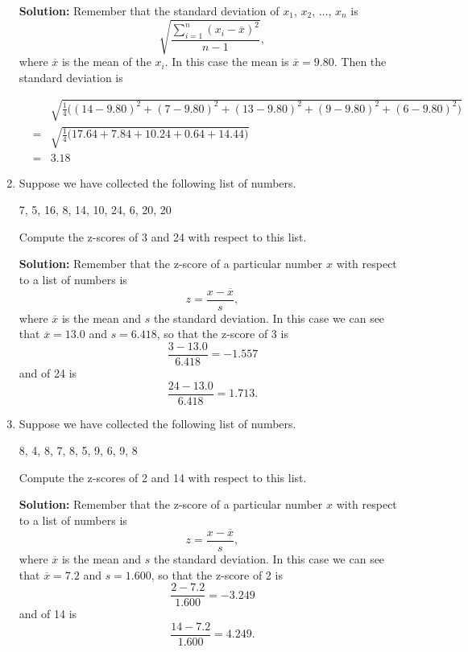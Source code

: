 \documentclass{article}
\begin{document}
\begin{enumerate}
\textbf{Solution:} Remember that the standard deviation of $x_1$, $x_2$, $\ldots$, $x_n$ is \[ \sqrt{\frac{\sum_{i=1}^n (x_i - \overline{x})^2}{n-1}}, \] where $\overline{x}$ is the mean of the $x_i$. In this case the mean is $\overline{x} = 9.80$. Then the standard deviation is

\begin{eqnarray*}
 & & \sqrt{\frac{1}{4}\big( (14 - 9.80)^2 + (7 - 9.80)^2 + (13 - 9.80)^2 + (9 - 9.80)^2 + (6 - 9.80)^2 \big)} \\
 & = & \sqrt{\frac{1}{4}\big( 17.64 + 7.84 + 10.24 + 0.64 + 14.44 \big)} \\
 & = & 3.18
\end{eqnarray*}


  
\vspace{1cm}

\item Suppose we have collected the following list of numbers.

\begin{center}
7, 5, 16, 8, 14, 10, 24, 6, 20, 20
\end{center}

Compute the z-scores of 3 and 24 with respect to this list.

\textbf{Solution:} Remember that the z-score of a particular number $x$ with respect to a list of numbers is \[ z = \frac{x - \overline{x}}{s}, \] where $\overline{x}$ is the mean and $s$ the standard deviation. In this case we can see that $\overline{x} = 13.0$ and $s = 6.418$, so that the z-score of 3 is \[ \frac{3 - 13.0}{6.418} = -1.557 \] and of 24 is  \[ \frac{24 - 13.0}{6.418} = 1.713. \]


  
\vspace{1cm}

\item Suppose we have collected the following list of numbers.

\begin{center}
8, 4, 8, 7, 8, 5, 9, 6, 9, 8
\end{center}

Compute the z-scores of 2 and 14 with respect to this list.

\textbf{Solution:} Remember that the z-score of a particular number $x$ with respect to a list of numbers is \[ z = \frac{x - \overline{x}}{s}, \] where $\overline{x}$ is the mean and $s$ the standard deviation.
In this case we can see that $\overline{x} = 7.2$ and $s = 1.600$, so that the z-score of 2 is
 \[ \frac{2 - 7.2}{1.600} = -3.249 \]
 and of 14 is  \[ \frac{14 - 7.2}{1.600} = 4.249. \]



\end{enumerate}
\end{document}
